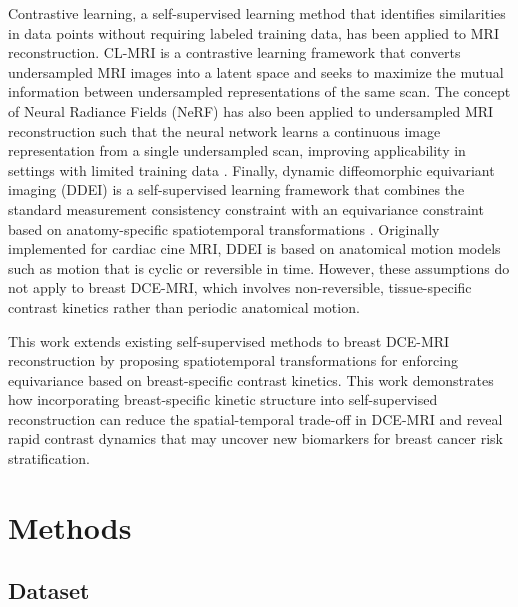\documentclass[runningheads]{llncs}
\begin{document}
Contrastive learning, a self-supervised learning method that identifies similarities in data points without requiring labeled training data, has been applied to MRI reconstruction. CL-MRI \cite{EKANAYAKE2025107185} is a contrastive learning framework that converts undersampled MRI images into a latent space and seeks to maximize the mutual information between undersampled representations of the same scan. The concept of Neural Radiance Fields (NeRF) has also been applied to undersampled MRI reconstruction such that the neural network learns a continuous image representation from a single undersampled scan, improving applicability in settings with limited training data \cite{jang2024nerfsolvesundersampledmri}. Finally, dynamic diffeomorphic equivariant imaging (DDEI) is a self-supervised learning framework that combines the standard measurement consistency constraint with an equivariance constraint based on anatomy-specific spatiotemporal transformations \cite{Wang_2025}. Originally implemented for cardiac cine MRI, DDEI is based on anatomical motion models such as motion that is cyclic or reversible in time. However, these assumptions do not apply to breast DCE-MRI, which involves non-reversible, tissue-specific contrast kinetics rather than periodic anatomical motion.

This work extends existing self-supervised methods to breast DCE-MRI reconstruction by proposing spatiotemporal transformations for enforcing equivariance based on breast-specific contrast kinetics. This work demonstrates how incorporating breast-specific kinetic structure into self-supervised reconstruction can reduce the spatial-temporal trade-off in DCE-MRI and reveal rapid contrast dynamics that may uncover new biomarkers for breast cancer risk stratification.


\section{Methods}

\subsection{Dataset}
\end{document}
